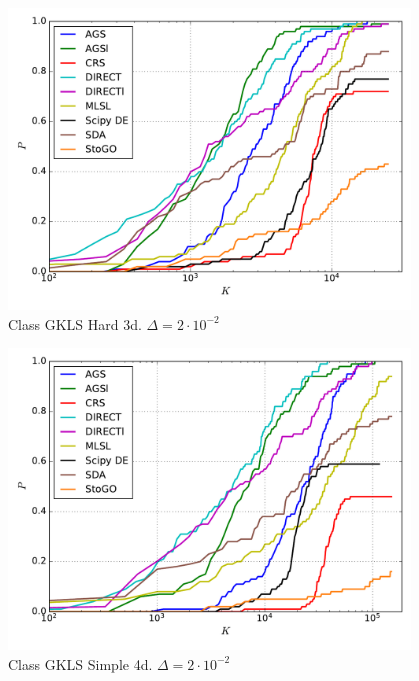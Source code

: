 \documentclass[a4paper]{article}
\begin{document}
\begin{figure}[H]
  \center
  \includegraphics[width=0.95\textwidth]{../experiments/gklsh3d/cmc.pdf}
  \caption{Class GKLS Hard 3d. $\Delta=2\cdot10^{-2}$}
\end{figure}


\begin{figure}[H]
  \center
  \includegraphics[width=0.95\textwidth]{../experiments/gklss4d/cmc.pdf}
  \caption{Class GKLS Simple 4d. $\Delta=2\cdot10^{-2}$}
\end{figure}

\end{document}
